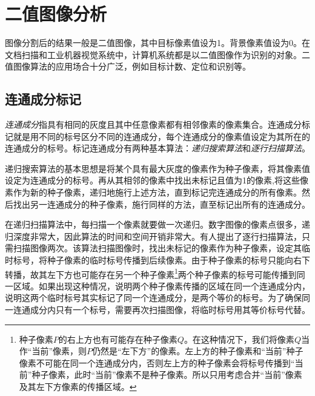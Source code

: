 \section{二值图像分析}

图像分割后的结果一般是二值图像，其中目标像素值设为1。背景像素值设为0。在文档扫描和工业机器视觉系统中，计算机系统都是以二值图像作为识别的对象。二值图像算法的应用场合十分广泛，例如目标计数、定位和识别等。

\subsection{连通成分标记}\label{sec:comp}

\emph{连通成分}指具有相同的灰度且其中任意像素都有相邻像素的像素集合。连通成分标记就是用不同的标号区分不同的连通成分，每个连通成分的像素值设定为其所在的连通成分的标号。标记连通成分有两种基本算法：\emph{递归搜索算法}和\emph{逐行扫描算法}。

递归搜索算法的基本思想是将某个具有最大灰度的像素作为种子像素，将其像素值设定为连通成分的标号。再从其相邻的像素中找出未标记且值为1的像素,将这些像素作为新的种子像素，递归地施行上述方法，直到标记完连通成分的所有像素。然后找出另一连通成分的种子像素，施行同样的方法，直至标记出所有的连通成分。%

在递归扫描算法中，每扫描一个像素就要做一次递归。数字图像的像素点很多，递归深度非常大，因此算法的时间和空间开销非常大。有人提出了逐行扫描算法，只需扫描图像两次。该算法扫描图像时，找出未标记的像素作为种子像素，设定其临时标号，将种子像素的临时标号传播到后续像素。由于种子像素的标号只能向右下转播，故其左下方也可能存在另一个种子像素\footnote{种子像素$P$的右上方也有可能存在种子像素$Q$。在这种情况下，我们将像素$Q$当作“当前”像素，则$P$仍然是“左下方”的像素。左上方的种子像素和“当前”种子像素不可能在同一个连通成分内，否则左上方的种子像素会将标号传播到“当前”种子像素，此时“当前”像素不是种子像素。所以只用考虑合并“当前”像素及其左下方像素的传播区域。}两个种子像素的标号可能传播到同一区域。如果出现这种情况，说明两个种子像素传播的区域在同一个连通成分内，说明这两个临时标号其实标记了同一个连通成分，是两个等价的标号。为了确保同一连通成分内只有一个标号，需要再次扫描图像，将临时标号用其等价标号代替。

